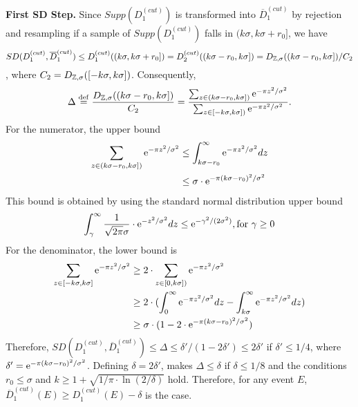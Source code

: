 \begin{sloppypar}
  \textbf{First SD Step.} Since $Supp(D_1^{(cut)})$ is transformed into
  $\overline{D}_1^{(cut)}$ by rejection and resampling if a sample of
  $Supp(D_1^{(cut)})$ falls in $(k\sigma,k\sigma+r_0]$, we have
  $$SD(D_1^{(cut)}, \overline{D}_1^{(cut)}) \leq
  D_1^{(cut)}((k\sigma,k\sigma+r_0]) = D_2^{(cut)}((k\sigma-r_0,k\sigma]) =
  D_{\mathbb{Z},\sigma}((k\sigma-r_0,k\sigma])/C_2$$, where
  $C_2 = D_{\mathbb{Z},\sigma}([-k\sigma,k\sigma])$. Consequently,
$$
\Delta \stackrel{\mathrm{def}}{=} \frac{D_{\mathbb{Z},\sigma}((k\sigma-r_0,k\sigma])}{C_2} = \frac{\sum_{z
    \in (k\sigma-r_0,k\sigma])} \mathrm{e}^{-\pi z^2/\sigma^2}}{\sum_{z \in
    [-k\sigma,k\sigma])} \mathrm{e}^{-\pi z^2/\sigma^2}}.
$$
For the numerator, the upper bound
\begin{align*}
  \sum_{z \in (k\sigma-r_0,k\sigma])} \mathrm{e}^{-\pi z^2/\sigma^2}
  &\leq \int^{\infty}_{k\sigma-r_0} \mathrm{e}^{-\pi z^2/\sigma^2} dz\\
  &\leq \sigma \cdot \mathrm{e}^{-\pi
    (k\sigma-r_0)^2/\sigma^2}
\end{align*}
This bound is obtained by using the standard normal distribution upper bound
$$\int^{\infty}_{\gamma} \frac{1}{\sqrt{2\pi} \sigma} \cdot \mathrm{e}^{- z^2/\sigma^2}
dz \leq \mathrm{e}^{-\gamma^2/(2\sigma^2)}, \text{for }\gamma \geq 0 $$
For the denominator, the lower bound is
\begin{align*}
  \sum_{z \in [-k\sigma,k\sigma]} \mathrm{e}^{-\pi z^2/\sigma^2}
  &\geq 2 \cdot \sum_{z \in [0,k\sigma])} \mathrm{e}^{-\pi z^2/\sigma^2}\\
  &\geq 2 \cdot (\int^{\infty}_{0} \mathrm{e}^{-\pi
    z^2/\sigma^2} dz - \int^{\infty}_{k\sigma} \mathrm{e}^{-\pi z^2/\sigma^2} dz)\\
  &\geq \sigma \cdot (1 - 2 \cdot \mathrm{e}^{-\pi (k\sigma-r_0)^2/\sigma^2})
\end{align*}
Therefore,
$SD(D_1^{(cut)}, \overline{D}_1^{(cut)}) \leq \Delta \leq \delta' / (1-2\delta')
\leq 2\delta'$ if $\delta' \leq 1/4$, where
$\delta' = \mathrm{e}^{-\pi (k\sigma-r_0)^2/\sigma^2}$. Defining $\delta = 2\delta'$, makes $\Delta \leq \delta$ if $\delta \leq 1/8$ and the conditions
$r_0 \leq \sigma$ and $k \geq 1 + \sqrt{1/\pi \cdot \ln(2/\delta)}$
hold. Therefore, for any event $E$, 
$\overline{D}_1^{(cut)}(E) \geq D_1^{(cut)}(E) - \delta$ is the case.
\end{sloppypar}

